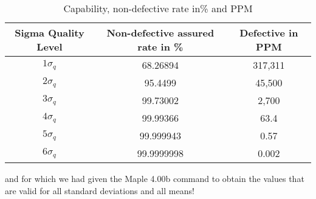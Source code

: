 \begin{enumerate}
\begin{center}
		\end{center}
	\begin{table}[H]
	\begin{center}
			\begin{tabular}{|c|c|c|}
				\hline
				\multicolumn{1}{c}{\cellcolor{black!30}\textbf{Sigma Quality Level}} & 
\multicolumn{1}{c}{\cellcolor{black!30}\textbf{Non-defective assured rate in \%}} & \multicolumn{1}{c}{\cellcolor{black!30}\textbf{Defective  in PPM}}  \\ \hline
		$1\sigma_q$ & 68.26894 & 317,311\\ \hline
		$2\sigma_q$ & 95.4499 & 45,500 \\ \hline
		$3\sigma_q$ & 99.73002 & 2,700 \\ \hline
		$4\sigma_q$ & 99.99366 & 63.4 \\ \hline
		$5\sigma_q$ & 99.999943 & 0.57 \\ \hline
		$6\sigma_q$ & 99.9999998 & 0.002 \\ \hline
	\end{tabular}
	\end{center}
	\caption{Capability, non-defective rate in\% and PPM}
	\end{table}
	and for which we had given the Maple 4.00b command to obtain the values that are valid for all standard deviations and all means!


\end{enumerate}
